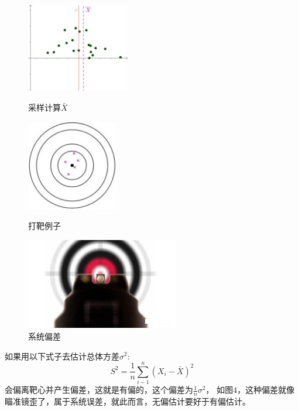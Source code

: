 \documentclass{article}
\begin{document}
\begin{figure}[ht]
    \centering
    \begin{minipage}[t]{4.5cm}
        \centering
        \includegraphics[width=4.5cm]{figure2.jpg}
        \caption{采样计算$\bar{X}$}
        \label{figs:SmapleExample}
    \end{minipage}
    \hspace{1cm}
    \begin{minipage}[t]{4cm}
        \centering
        \includegraphics[width=4cm]{figure3.jpg}
        \caption{打靶例子}
        \label{figs:ShotExample1}
    \end{minipage}
    \hspace{1cm}
    \begin{minipage}[t]{6.7cm}
        \centering
        \includegraphics[width=6.7cm]{figure4.jpg}
        \caption{系统偏差}
        \label{figs:ShotExample2}
    \end{minipage}
\end{figure}


如果用以下式子去估计总体方差$\sigma^2$:
\begin{equation}
    S^2=\frac{1}{n}\sum\limits_{i-1}^n{(X_i-\bar{X})^2}
\end{equation}
会偏离靶心并产生偏差，这就是有偏的，这个偏差为$\frac{1}{n}\sigma^2$，
如图4，这种偏差就像瞄准镜歪了，属于系统误差，就此而言，无偏估计要好于有偏估计。
\end{document}

